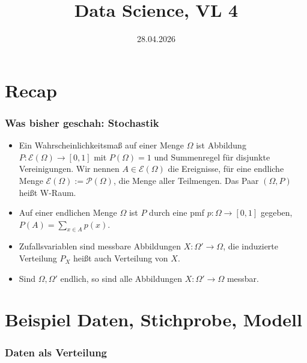 

\title{Data Science, VL 4} %
\date{28.04.2026} %



\begin{frame}
  \titlepage
\end{frame}

\section{Recap}

\begin{frame}
  \frametitle{Was bisher geschah: Stochastik}
  \begin{itemize}[<+->]
  \item Ein \alert{Wahrscheinlichkeitsmaß} auf einer Menge $\Omega$ ist Abbildung $P : \mathcal{E}(\Omega) \to [0,1]$ mit $P(\Omega)=1$ und Summenregel für disjunkte Vereinigungen. Wir nennen $A \in \mathcal{E}(\Omega)$ die \alert{Ereignisse}, für eine endliche Menge $\mathcal{E}(\Omega) := \mathcal{P}(\Omega)$, die Menge aller Teilmengen. Das Paar $(\Omega,P)$ heißt \alert{W-Raum}.
    \item Auf einer endlichen Menge $\Omega$ ist $P$ durch eine \alert{pmf} $p \colon \Omega \to [0,1]$ gegeben, $P(A) = \sum_{x\in A} p(x)$.
    \item \alert{Zufallsvariablen} sind messbare Abbildungen $X \colon \Omega' \to \Omega$, die induzierte Verteilung $P_X$ heißt auch \alert{Verteilung von $X$}.
    \item Sind $\Omega, \Omega'$ endlich, so sind alle Abbildungen $X \colon \Omega' \to \Omega$ messbar.
    \end{itemize}
\end{frame}



\section{Beispiel Daten, Stichprobe, Modell}

\begin{frame}
  \frametitle{Daten als Verteilung}

 
\end{frame}

